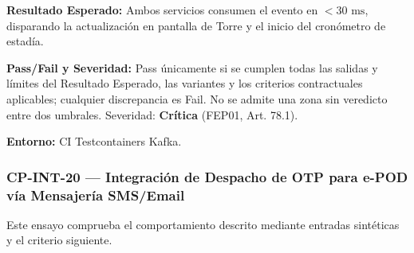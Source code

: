 \par\noindent\textbf{Resultado Esperado:} Ambos servicios consumen el evento en \(< 30\text{ ms}\), disparando la actualización en pantalla de Torre y el inicio del cronómetro de estadía.\par
\par\noindent\textbf{Pass/Fail y Severidad:} Pass únicamente si se cumplen todas las salidas y límites del Resultado Esperado, las variantes y los criterios contractuales aplicables; cualquier discrepancia es Fail. No se admite una zona sin veredicto entre dos umbrales. Severidad: \textbf{Crítica} (FEP01, Art. 78.1).\par
\par\noindent\textbf{Entorno:} CI Testcontainers Kafka.\par






\subsubsection*{CP-INT-20 — Integración de Despacho de OTP para e-POD vía Mensajería SMS/Email}\label{sec:9-cp-int-20}
Este ensayo comprueba el comportamiento descrito mediante entradas sintéticas y el criterio siguiente.

